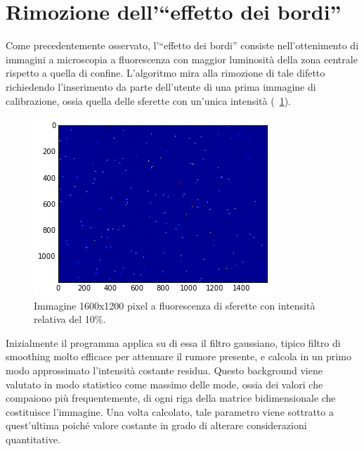 \section{Rimozione dell'``effetto dei bordi''}

Come precedentemente osservato, l'``effetto dei bordi'' consiste nell'ottenimento di immagini a microscopia a fluorescenza con maggior luminosità della zona centrale rispetto a quella di confine. 
L'algoritmo mira alla rimozione di tale difetto richiedendo l'inserimento da parte dell'utente di una prima immagine di calibrazione, ossia quella delle sferette con un'unica intensità (\figurename~\ref{fig:unaint}).

\begin{figure}
 \centering
 \includegraphics[scale=1]{img/CAP3unaint.png}
 \caption{\small{Immagine 1600x1200 pixel a fluorescenza di sferette con intensità relativa del 10\%.}}
 \label{fig:unaint}
\end{figure}

Inizialmente il programma applica su di essa il filtro gaussiano, tipico filtro di smoothing molto efficace per attenuare il rumore presente, e calcola in un primo modo approssimato l'intensità costante residua.
Questo background viene valutato in modo statistico come massimo delle mode, ossia dei valori che compaiono più frequentemente, di ogni riga della matrice bidimensionale che costituisce l'immagine. 
Una volta calcolato, tale parametro viene sottratto a quest'ultima poiché valore costante in grado di alterare considerazioni quantitative.

